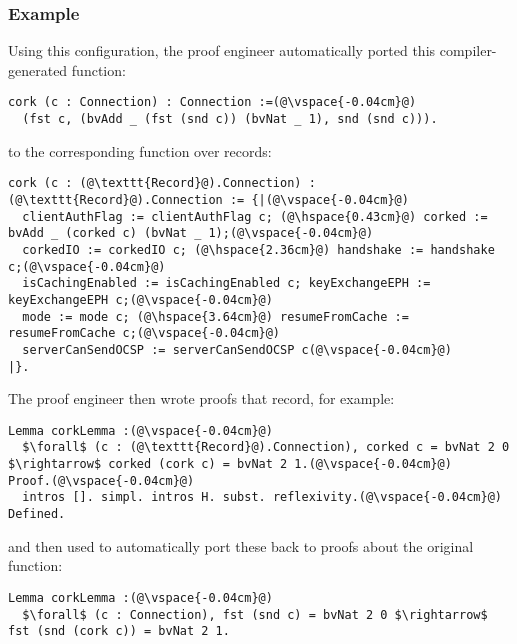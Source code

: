 \subsubsection{Example}
Using this configuration, the proof engineer automatically ported this compiler-generated function:

\begin{lstlisting}
cork (c : Connection) : Connection :=(@\vspace{-0.04cm}@)
  (fst c, (bvAdd _ (fst (snd c)) (bvNat _ 1), snd (snd c))).
\end{lstlisting}
to the corresponding function over records:

\begin{lstlisting}[backgroundcolor=\color{cyan!30}]
cork (c : (@\texttt{Record}@).Connection) : (@\texttt{Record}@).Connection := {|(@\vspace{-0.04cm}@)
  clientAuthFlag := clientAuthFlag c; (@\hspace{0.43cm}@) corked := bvAdd _ (corked c) (bvNat _ 1);(@\vspace{-0.04cm}@)
  corkedIO := corkedIO c; (@\hspace{2.36cm}@) handshake := handshake c;(@\vspace{-0.04cm}@)
  isCachingEnabled := isCachingEnabled c; keyExchangeEPH := keyExchangeEPH c;(@\vspace{-0.04cm}@)
  mode := mode c; (@\hspace{3.64cm}@) resumeFromCache := resumeFromCache c;(@\vspace{-0.04cm}@)
  serverCanSendOCSP := serverCanSendOCSP c(@\vspace{-0.04cm}@)
|}.
\end{lstlisting}
The proof engineer then wrote proofs that record, for example:

\begin{lstlisting}
Lemma corkLemma :(@\vspace{-0.04cm}@)
  $\forall$ (c : (@\texttt{Record}@).Connection), corked c = bvNat 2 0 $\rightarrow$ corked (cork c) = bvNat 2 1.(@\vspace{-0.04cm}@)
Proof.(@\vspace{-0.04cm}@)
  intros []. simpl. intros H. subst. reflexivity.(@\vspace{-0.04cm}@)
Defined.
\end{lstlisting} %
and then used \toolname to automatically port these back to proofs about the original function:

\begin{lstlisting}[backgroundcolor=\color{cyan!30}]
Lemma corkLemma :(@\vspace{-0.04cm}@)
  $\forall$ (c : Connection), fst (snd c) = bvNat 2 0 $\rightarrow$ fst (snd (cork c)) = bvNat 2 1.
\end{lstlisting} %

